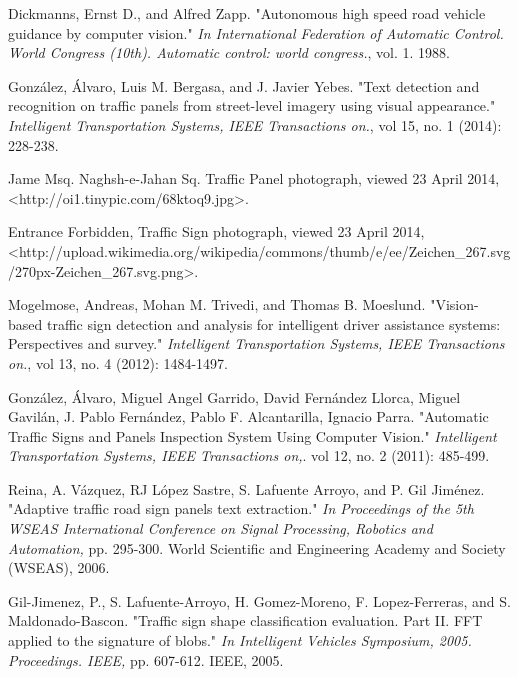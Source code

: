 \documentclass[12pt,a4paper]{article}
\theoremstyle{definition}
\theoremstyle{theorem}
\theoremstyle{definition}
\begin{document}
\newpage
\small
\begin{thebibliography}{99}

\begin{LTRitems}

\resetlatinfont

Dickmanns, Ernst D., and Alfred Zapp. "Autonomous high speed road vehicle guidance by computer vision." {\em In International Federation of Automatic Control. World Congress (10th). Automatic control: world congress.}, vol. 1. 1988.

González, Álvaro, Luis M. Bergasa, and J. Javier Yebes. "Text detection and recognition on traffic panels from street-level imagery using visual appearance." {\em Intelligent Transportation Systems, IEEE Transactions on.}, vol 15, no. 1 (2014): 228-238.

Jame Msq. Naghsh-e-Jahan Sq. Traffic Panel photograph, viewed 23 April 2014,
<http://oi1.tinypic.com/68ktoq9.jpg>.

Entrance Forbidden, Traffic Sign photograph, viewed 23 April 2014,
<http://upload.wikimedia.org/wikipedia/commons/thumb/e/ee/Zeichen\_267.svg/270px-Zeichen\_267.svg.png>.

Mogelmose, Andreas, Mohan M. Trivedi, and Thomas B. Moeslund. "Vision-based traffic sign detection and analysis for intelligent driver assistance systems: Perspectives and survey." {\em Intelligent Transportation Systems, IEEE Transactions on.}, vol 13, no. 4 (2012): 1484-1497.

González, Álvaro, Miguel Angel Garrido, David Fernández Llorca, Miguel Gavilán, J. Pablo Fernández, Pablo F. Alcantarilla, Ignacio Parra. "Automatic Traffic Signs and Panels Inspection System Using Computer Vision." {\em Intelligent Transportation Systems, IEEE Transactions on,}. vol 12, no. 2 (2011): 485-499.

Reina, A. Vázquez, RJ López Sastre, S. Lafuente Arroyo, and P. Gil Jiménez. "Adaptive traffic road sign panels text extraction." {\em In Proceedings of the 5th WSEAS International Conference on Signal Processing, Robotics and Automation,} pp. 295-300. World Scientific and Engineering Academy and Society (WSEAS), 2006.

Gil-Jimenez, P., S. Lafuente-Arroyo, H. Gomez-Moreno, F. Lopez-Ferreras, and S. Maldonado-Bascon. "Traffic sign shape classification evaluation. Part II. FFT applied to the signature of blobs." {\em In Intelligent Vehicles Symposium, 2005. Proceedings. IEEE,} pp. 607-612. IEEE, 2005.


\end{LTRitems}
\end{thebibliography}
\end{document}
